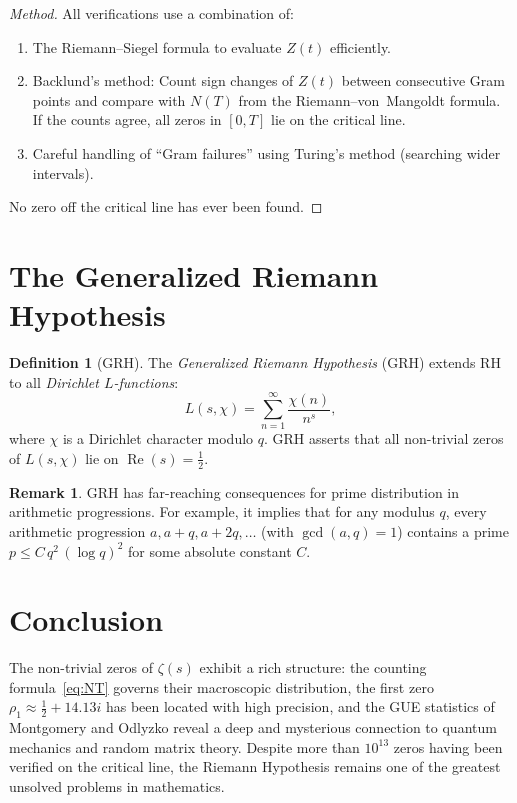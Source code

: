\documentclass[12pt,a4paper]{amsart}
\theoremstyle{definition}
\newtheorem{definition}[theorem]{Definition}
\newtheorem{remark}[theorem]{Remark}
\DeclareMathOperator{\Re}{Re}
\begin{document}
\begin{proof}[Method]
All verifications use a combination of:
\begin{enumerate}
  \item The Riemann--Siegel formula to evaluate $Z(t)$ efficiently.
  \item Backlund's method: Count sign changes of $Z(t)$ between consecutive
    Gram points and compare with $N(T)$ from the Riemann--von~Mangoldt formula.
    If the counts agree, all zeros in $[0,T]$ lie on the critical line.
  \item Careful handling of ``Gram failures'' using Turing's method
    (searching wider intervals).
\end{enumerate}
No zero off the critical line has ever been found.
\end{proof}

\section{The Generalized Riemann Hypothesis}

\begin{definition}[GRH]
\label{def:grh}
The \emph{Generalized Riemann Hypothesis} (GRH) extends RH to all
\emph{Dirichlet $L$-functions}:
\[
  L(s, \chi) = \sum_{n=1}^{\infty} \frac{\chi(n)}{n^s},
\]
where $\chi$ is a Dirichlet character modulo $q$.
GRH asserts that all non-trivial zeros of $L(s,\chi)$ lie on $\Re(s) = \tfrac{1}{2}$.
\end{definition}

\begin{remark}
GRH has far-reaching consequences for prime distribution in arithmetic
progressions.  For example, it implies that for any modulus $q$, every
arithmetic progression $a, a+q, a+2q, \ldots$ (with $\gcd(a,q)=1$)
contains a prime $p \le C\,q^2\,(\log q)^2$ for some absolute constant $C$.
\end{remark}

\section{Conclusion}

The non-trivial zeros of $\zeta(s)$ exhibit a rich structure: the counting
formula~\eqref{eq:NT} governs their macroscopic distribution, the first
zero $\rho_1 \approx \tfrac{1}{2} + 14.13i$ has been located with high
precision, and the GUE statistics of Montgomery and Odlyzko reveal a deep
and mysterious connection to quantum mechanics and random matrix theory.
Despite more than $10^{13}$ zeros having been verified on the critical line,
the Riemann Hypothesis remains one of the greatest unsolved problems in
mathematics.
\end{document}
